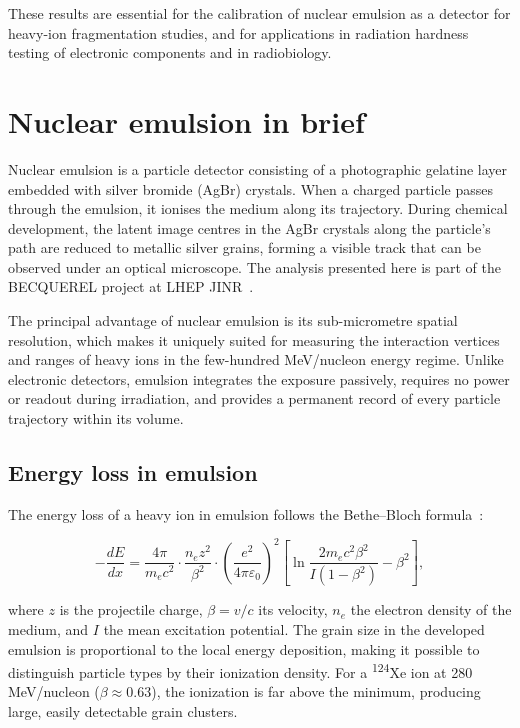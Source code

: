 \documentclass[12pt,a4paper]{article}
\begin{document}
These results are essential for the calibration of nuclear emulsion as
a detector for heavy-ion fragmentation studies, and for applications in
radiation hardness testing of electronic components and in
radiobiology.

\section{Nuclear emulsion in brief}
\label{sec:emulsion}

Nuclear emulsion is a particle detector consisting of a photographic
gelatine layer embedded with silver bromide (AgBr) crystals. When a
charged particle passes through the emulsion, it ionises the medium
along its trajectory. During chemical development, the latent image
centres in the AgBr crystals along the particle's path are reduced to
metallic silver grains, forming a visible track that can be observed
under an optical microscope. The analysis presented here is part of
the BECQUEREL project at LHEP JINR~\cite{becquerel, zarubin2016}.

The principal advantage of nuclear emulsion is its sub-micrometre
spatial resolution, which makes it uniquely suited for measuring the
interaction vertices and ranges of heavy ions in the few-hundred
MeV/nucleon energy regime. Unlike electronic detectors, emulsion
integrates the exposure passively, requires no power or readout during
irradiation, and provides a permanent record of every particle
trajectory within its volume.

\subsection{Energy loss in emulsion}

The energy loss of a heavy ion in emulsion follows the
Bethe--Bloch formula~\cite{bethe1930}:

\[
-\frac{dE}{dx} = \frac{4\pi}{m_e c^2}\cdot
\frac{n_e z^2}{\beta^2}\cdot
\left(\frac{e^2}{4\pi\varepsilon_0}\right)^{\!2}
\left[\ln\frac{2m_e c^2\beta^2}{I(1-\beta^2)} - \beta^2\right],
\]

\noindent where $z$ is the projectile charge, $\beta = v/c$ its
velocity, $n_e$ the electron density of the medium, and $I$ the mean
excitation potential. The grain size in the developed emulsion is
proportional to the local energy deposition, making it possible to
distinguish particle types by their ionization density. For a
\textsuperscript{124}Xe ion at 280\,MeV/nucleon ($\beta \approx 0.63$),
the ionization is far above the minimum, producing large, easily
detectable grain clusters.
\end{document}
